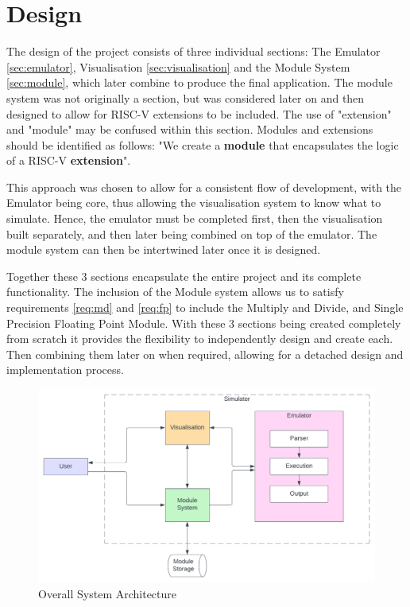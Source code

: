 

\chapter{Design}
\label{ch:design}
The design of the project consists of three individual sections: The Emulator \ref{sec:emulator}, Visualisation \ref{sec:visualisation} and the Module System \ref{sec:module}, which later combine to produce the final application. The module system was not originally a section, but was considered later on and then designed to allow for RISC-V extensions to be included. The use of "extension" and "module" may be confused within this section. Modules and extensions should be identified as follows: "We create a \textbf{module} that encapsulates the logic of a RISC-V \textbf{extension}".

This approach was chosen to allow for a consistent flow of development, with the Emulator being core, thus allowing the visualisation system to know what to simulate. Hence, the emulator must be completed first, then the visualisation built separately, and then later being combined on top of the emulator. The module system can then be intertwined later once it is designed. 

Together these 3 sections encapsulate the entire project and its complete functionality. The inclusion of the Module system allows us to satisfy requirements \ref{req:md} and \ref{req:fp} to include the Multiply and Divide, and Single Precision Floating Point Module. With these 3 sections being created completely from scratch it provides the flexibility to independently design and create each. Then combining them later on when required, allowing for a detached design and implementation process.

\begin{figure}[h]
    \centering
    \includegraphics[width=0.95\linewidth]{dissertation/DATA/sys architecture.png}
    \caption{Overall System Architecture}
    \label{fig:sys_architecture}
\end{figure}


